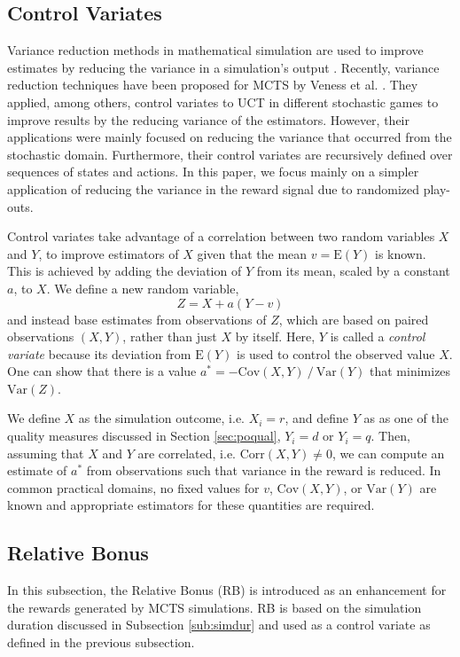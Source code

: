 \documentclass{ecai2014}
\newcommand{\E}[1]{\mathrm{E}\left( #1 \right)}
\newcommand{\Var}[1]{\mathrm{Var}\left( #1 \right)}
\newcommand{\Cov}[1]{\mathrm{Cov}\left( #1 \right)}
\newcommand{\Corr}[1]{\mathrm{Corr}\left( #1 \right)}
\begin{document}
\subsection{Control Variates}
\label{sub:cv}
Variance reduction methods in mathematical simulation are used to improve estimates by reducing the variance in a simulation's output \cite{kelton2000simulation}. Recently, variance reduction techniques have been proposed for MCTS by Veness et al. \cite{Veness11variance}. They applied, among others, control variates to UCT in different stochastic games to improve results by the reducing variance of the estimators. However, their applications were mainly focused on reducing the variance that occurred from the stochastic domain. Furthermore, their control variates are recursively defined over sequences of states and actions. In this paper, we focus mainly on a simpler application of reducing the variance in the reward signal due to randomized play-outs.  

Control variates take advantage of a correlation between two random variables $X$ and $Y$, to improve estimators of $X$ given that the mean $v=\E{Y}$ is known. This is achieved by adding the deviation of $Y$ from its mean, scaled by a constant $a$, to $X$. We define a new random variable, 
\begin{equation}
Z=X+a\left(Y-v\right)
\label{eq:cv}
\end{equation}
and instead base estimates from observations of $Z$, which are based on paired observations $(X,Y)$, rather than just $X$ by itself. 
Here, $Y$ is called a {\it control variate} because its deviation from $\E{Y}$ is used to control the observed value $X$. 
One can show that there is a value $a^*=-\Cov{X,Y}\mathbin{/}\Var{Y}$ that minimizes $\Var{Z}$.

We define $X$ as the simulation outcome, i.e. $X_i=r$, and define $Y$ as as one of the quality measures discussed in Section \ref{sec:poqual}, $Y_i=d$ or $Y_i=q$. Then, assuming that $X$ and $Y$ are correlated, i.e. $\Corr{X,Y}\neq0$, we can compute an estimate of  $a^*$ from observations such that variance in the reward is reduced. In common practical domains, no fixed values for $v$, $\Cov{X,Y}$, or $\Var{Y}$ are known and appropriate estimators for these quantities are required.

\subsection{Relative Bonus}
\label{subsec:rb}
In this subsection, the Relative Bonus (RB) is introduced as an enhancement for the rewards generated by MCTS simulations. RB is based on the simulation duration discussed in Subsection \ref{sub:simdur} and used as a control variate as defined in the previous subsection.
\end{document}

